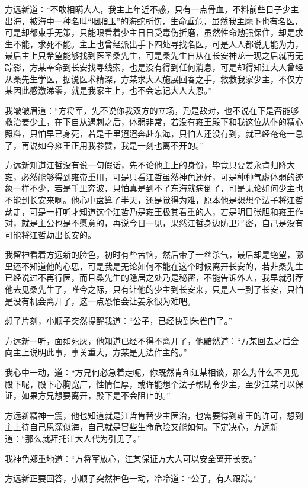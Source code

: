 方远新道：“不敢相瞒大人，我主上年近不惑，只有一点骨血，不料前些日子少主出海，被海中一种名叫“胭脂玉”的海蛇所伤，生命垂危，虽然我主麾下也有名医，可是却都束手无策，只能眼看着少主日日受毒伤折磨，虽然性命勉强保住，却是求生不能，求死不能。主上也曾经派出手下四处寻找名医，可是人人都说无能为力，最后主上只希望能够找到医圣桑先生，可是桑先生自从在长安神龙一现之后就再无踪影，方某奉命到长安找寻线索，也是没有得到任何消息，可是却得知江大人曾经从桑先生学医，据说医术精深，方某求大人施展回春之手，救救我家少主，不仅方某因此感激涕零，就是我家主上，也不会忘记大人大恩。”

我皱皱眉道：“方将军，先不说你我双方的立场，乃是敌对，也不说在下是否能够救治姜少主，在下自从遇刺之后，体弱非常，若没有雍王殿下和我这位从仆的精心照料，只怕早已身死，若是千里迢迢奔赴东海，只怕人还没有到，就已经奄奄一息了，再说如今雍王正用我参赞，我是一刻也离不开的。”

方远新知道江哲没有说一句假话，先不论他主上的身份，毕竟只要姜永肯归降大雍，必然能够得到雍帝重用，可是只看江哲虽然神色还好，可是种种气虚体弱的迹象一样不少，若是千里奔波，只怕真是到不了东海就病倒了，可是无论如何少主也不能到长安来啊。他心中盘算了半天，还是觉得为难，原本他是想想个法子将江哲劫走，可是一打听才知道这个江哲乃是雍王极其看重的人，若是明目张胆和雍王作对，就是主公也是不愿意的，再说今日一见，果然江哲身边防卫严密，自己是没有可能将江哲劫出长安的。

我留神看着方远新的脸色，初时有些苦恼，然后带了一丝杀气，最后却是绝望，哪里还不知道他的心思，可是我是无论如何不能在这个时候离开长安的，若非桑先生已经说过不再行医，而且桑先生的隐居之处乃是秘密，不能告诉外人，我早就引荐他去见桑先生了，唯今之际，只有让他的少主到长安来，只是人一到了长安，只怕是没有机会离开了，这一点恐怕会让姜永很为难吧。

想了片刻，小顺子突然提醒我道：“公子，已经快到朱雀门了。”

方远新一听，面如死灰，他知道已经不得不离开了，他黯然道：“方某回去之后会向主上说明此事，事关重大，方某是无法作主的。”

我心中一动，道：“方兄何必急着走呢，你既然肯和江某相谈，那么为什么不见见殿下呢，殿下心胸宽广，性情仁厚，或许能想个法子帮助令少主，至少江某可以保证，如果方兄想要离开，殿下是不会阻止的。”

方远新精神一震，他也知道就是江哲肯替少主医治，也需要得到雍王的许可，想到主上待自己恩深似海，自己就是冒些生命危险又能如何。下定决心，方远新道：“那么就拜托江大人代为引见了。”

我神色郑重地道：“方将军放心，江某保证方大人可以安全离开长安。”

方远新正要回答，小顺子突然神色一动，冷冷道：“公子，有人跟踪。”

